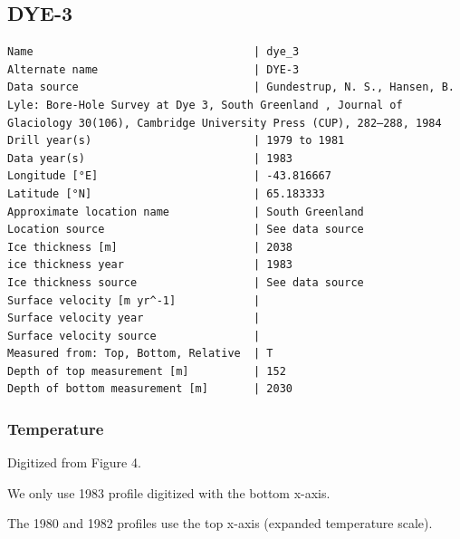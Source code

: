 \documentclass[article,a4paper,times,11pt,twoside]{article}
\begin{document}
\subsection{DYE-3}
\label{sec:org31b8c7b}
\begin{verbatim}
Name                                  | dye_3
Alternate name                        | DYE-3
Data source                           | Gundestrup, N. S., Hansen, B. Lyle: Bore-Hole Survey at Dye 3, South Greenland , Journal of Glaciology 30(106), Cambridge University Press (CUP), 282–288, 1984 
Drill year(s)                         | 1979 to 1981
Data year(s)                          | 1983
Longitude [°E]                        | -43.816667
Latitude [°N]                         | 65.183333
Approximate location name             | South Greenland
Location source                       | See data source
Ice thickness [m]                     | 2038
ice thickness year                    | 1983
Ice thickness source                  | See data source
Surface velocity [m yr^-1]            | 
Surface velocity year                 | 
Surface velocity source               | 
Measured from: Top, Bottom, Relative  | T
Depth of top measurement [m]          | 152
Depth of bottom measurement [m]       | 2030
\end{verbatim}

\subsubsection{Temperature}
\label{sec:org813ba08}

Digitized from \textcite{gundestrup_1984} Figure 4.

We only use 1983 profile digitized with the bottom x-axis.

The 1980 and 1982 profiles use the top x-axis (expanded temperature scale).
\end{document}
